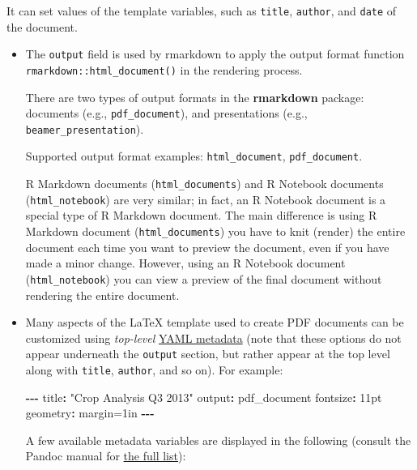 \documentclass[
]{book}
\newenvironment{Shaded}{\begin{snugshade}}{\end{snugshade}}
\newcommand{\DataTypeTok}[1]{\textcolor[rgb]{0.13,0.29,0.53}{#1}}
\newcommand{\DecValTok}[1]{\textcolor[rgb]{0.00,0.00,0.81}{#1}}
\newcommand{\NormalTok}[1]{#1}
\newcommand{\OtherTok}[1]{\textcolor[rgb]{0.56,0.35,0.01}{#1}}
\newcommand{\SpecialCharTok}[1]{\textcolor[rgb]{0.81,0.36,0.00}{\textbf{#1}}}
\newcommand{\StringTok}[1]{\textcolor[rgb]{0.31,0.60,0.02}{#1}}
\begin{document}
It can set values of the template variables, such as \texttt{title}, \texttt{author}, and \texttt{date} of the document.

\begin{itemize}
\item
  The \texttt{output} field is used by rmarkdown to apply the output format function \texttt{rmarkdown::html\_document()} in the rendering process.

  There are two types of output formats in the \textbf{rmarkdown} package: documents (e.g., \texttt{pdf\_document}), and presentations (e.g., \texttt{beamer\_presentation}).

  Supported output format examples: \texttt{html\_document}, \texttt{pdf\_document}.

  R Markdown documents (\texttt{html\_documents}) and R Notebook documents (\texttt{html\_notebook}) are very similar; in fact, an R Notebook document is a special type of R Markdown document. The main difference is using R Markdown document (\texttt{html\_documents}) you have to knit (render) the entire document each time you want to preview the document, even if you have made a minor change. However, using an R Notebook document (\texttt{html\_notebook}) you can view a preview of the final document without rendering the entire document.
\item
  Many aspects of the LaTeX template used to create PDF documents can be customized using \emph{top-level} \href{https://bookdown.org/yihui/rmarkdown/pdf-document.html\#tab:latex-vars}{YAML metadata} (note that these options do not appear underneath the \texttt{output} section, but rather appear at the top level along with \texttt{title}, \texttt{author}, and so on). For example:

\begin{Shaded}
\begin{Highlighting}[]
\SpecialCharTok{{-}{-}{-}}
\NormalTok{title}\SpecialCharTok{:} \StringTok{"Crop Analysis Q3 2013"}
\NormalTok{output}\SpecialCharTok{:}\NormalTok{ pdf\_document}
\NormalTok{fontsize}\SpecialCharTok{:} \DecValTok{11}\NormalTok{pt}
\NormalTok{geometry}\SpecialCharTok{:}\NormalTok{ margin}\OtherTok{=}\DecValTok{1}\DataTypeTok{i}\NormalTok{n}
\SpecialCharTok{{-}{-}{-}}
\end{Highlighting}
\end{Shaded}

  A few available metadata variables are displayed in the following (consult the Pandoc manual for \href{https://pandoc.org/MANUAL.html\#variables-for-latex}{the full list}):


\end{itemize}
\end{document}
